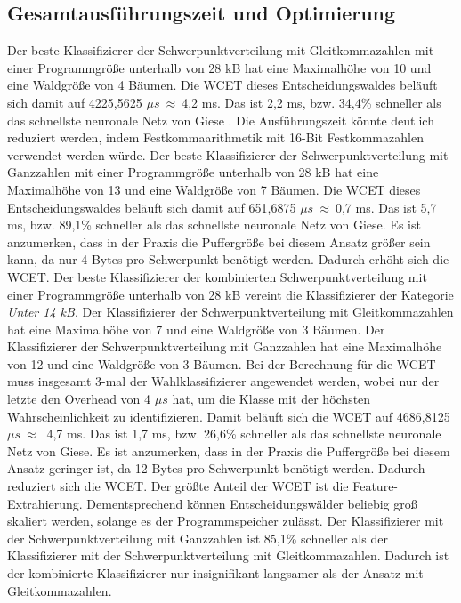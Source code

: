 \subsection{Gesamtausführungszeit und Optimierung}
Der beste Klassifizierer der Schwerpunktverteilung mit Gleitkommazahlen mit einer Programmgröße unterhalb von 28 kB hat eine Maximalhöhe von 10 und eine Waldgröße von 4 Bäumen. Die WCET dieses Entscheidungswaldes
beläuft sich damit auf 4225,5625 $\mu s\ \approx\ $4,2 ms. Das ist 2,2 ms, bzw. 34,4\% schneller als das schnellste neuronale Netz von Giese \cite{gieseThesis}. Die Ausführungszeit könnte deutlich reduziert werden, indem
Festkommaarithmetik mit 16-Bit Festkommazahlen verwendet werden würde.
\newline
\newline
Der beste Klassifizierer der Schwerpunktverteilung mit Ganzzahlen mit einer Programmgröße unterhalb von 28 kB hat eine Maximalhöhe von 13 und eine Waldgröße von 7 Bäumen. Die WCET dieses Entscheidungswaldes
beläuft sich damit auf 651,6875 $\mu s\ \approx\ $0,7 ms. Das ist 5,7 ms, bzw. 89,1\% schneller als das schnellste neuronale Netz von Giese. Es ist anzumerken, dass in der Praxis die Puffergröße
bei diesem Ansatz größer sein kann, da nur 4 Bytes pro Schwerpunkt benötigt werden. Dadurch erhöht sich die WCET.
\newline
\newline
Der beste Klassifizierer der kombinierten Schwerpunktverteilung mit einer Programmgröße unterhalb von 28 kB vereint die Klassifizierer der Kategorie \textit{Unter 14 kB}. Der Klassifizierer der Schwerpunktverteilung
mit Gleitkommazahlen hat eine Maximalhöhe von 7 und eine Waldgröße von 3 Bäumen. Der Klassifizierer der Schwerpunktverteilung mit Ganzzahlen hat eine Maximalhöhe von 12 und eine Waldgröße von 3 Bäumen. Bei der
Berechnung für die WCET muss insgesamt 3-mal der Wahlklassifizierer angewendet werden, wobei nur der letzte den Overhead von 4 $\mu s$ hat, um die Klasse mit der höchsten Wahrscheinlichkeit zu identifizieren. Damit
beläuft sich die WCET auf 4686,8125 $\mu s\ \approx\ $ 4,7 ms. Das ist 1,7 ms, bzw. 26,6\% schneller als das schnellste neuronale Netz von Giese. Es ist anzumerken, dass in der Praxis die Puffergröße
bei diesem Ansatz geringer ist, da 12 Bytes pro Schwerpunkt benötigt werden. Dadurch reduziert sich die WCET.
\newline
\newline
Der größte Anteil der WCET ist die Feature-Extrahierung. Dementsprechend können Entscheidungswälder beliebig groß skaliert werden, solange es der Programmspeicher zulässt. Der Klassifizierer mit der Schwerpunktverteilung
mit Ganzzahlen ist 85,1\% schneller als der Klassifizierer mit der Schwerpunktverteilung mit Gleitkommazahlen. Dadurch ist der kombinierte Klassifizierer nur insignifikant langsamer als der Ansatz mit Gleitkommazahlen.